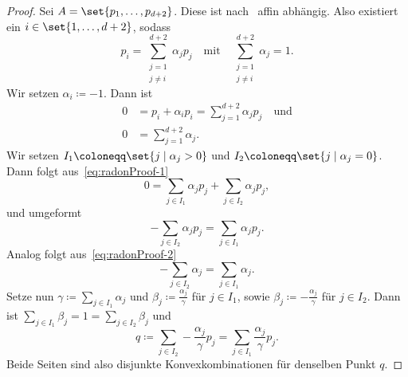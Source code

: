 \documentclass[language=ngerman,algolist,acrolist]{TemplateLecture}
\begin{document}
\begin{proof}
    Sei $A = \set{p_1, \ldots, p_{d + 2}}$. Diese ist nach~ affin abhängig. Also existiert ein $i \in \set{1, \ldots, d + 2}$, sodass 
    \begin{equation*}
        p_i = \sum_{\substack{j = 1 \\ j \neq i}}^{d + 2} \alpha_j p_j \quad \text{mit} \quad \sum_{\substack{j = 1 \\ j \neq i}}^{d + 2} \alpha_j = 1.
    \end{equation*}
    Wir setzen $\alpha_i \coloneqq -1$. Dann ist 
    \begin{align}
        0 &= p_i + \alpha_i p_i = \sum_{j = 1}^{d + 2} \alpha_j p_j \quad \text{und} \label{eq:radonProof-1} \\
        0 &= \sum_{j = 1}^{d + 2} \alpha_j. \label{eq:radonProof-2}
    \end{align}
    Wir setzen $I_1 \coloneqq \set{j \mid \alpha_j > 0}$ und $I_2 \coloneqq \set{j \mid \alpha_j = 0}$. Dann folgt aus~\eqref{eq:radonProof-1} 
    \begin{equation*}
        0 = \sum_{j \in I_1} \alpha_j p_j + \sum_{j \in I_2} \alpha_j p_j,
    \end{equation*}
    und umgeformt 
    \begin{equation*}
        - \sum_{j \in I_2} \alpha_j p_j = \sum_{j \in I_1} \alpha_j p_j.
    \end{equation*}
    Analog folgt aus~\eqref{eq:radonProof-2} 
    \begin{equation*}
        -\sum_{j \in I_2} \alpha_j = \sum_{j \in I_1} \alpha_j.
    \end{equation*}
    Setze nun $\gamma \coloneqq \sum_{j \in I_1} \alpha_j$ und $\beta_j \coloneqq \frac{\alpha_j}{\gamma}$ für $j \in I_1$, sowie $\beta_j \coloneqq -\frac{\alpha_j}{\gamma}$ für $j \in I_2$. Dann ist $\sum_{j \in I_1} \beta_j = 1 = \sum_{j \in I_2} \beta_j$ und 
    \begin{equation*}
        q \coloneqq \sum_{j \in I_2} -\frac{\alpha_j}{\gamma} p_j = \sum_{j \in I_1} \frac{\alpha_j}{\gamma} p_j.
    \end{equation*}
    Beide Seiten sind also disjunkte Konvexkombinationen für denselben Punkt $q$.
\end{proof}
\end{document}
